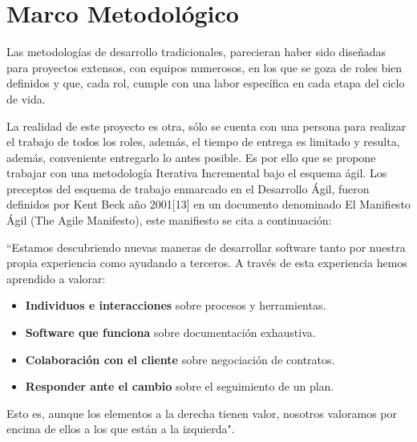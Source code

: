 \chapter{Marco Metodológico}
\label{chap:marcometodologico}

Las metodologías de desarrollo tradicionales, parecieran haber sido diseñadas para proyectos extensos, con equipos numerosos, en los que se goza de roles bien definidos y que, cada rol, cumple con una labor específica en cada etapa del ciclo de vida.

La realidad de este proyecto es otra, sólo se cuenta con una persona para realizar el trabajo de todos los roles, además, el tiempo de entrega es limitado y resulta, además, conveniente entregarlo lo antes posible. Es por ello que se propone trabajar con una metodología Iterativa Incremental bajo el esquema ágil. Los preceptos del esquema de trabajo enmarcado en el Desarrollo Ágil, fueron definidos por Kent Beck año 2001[13] en un documento denominado El Manifiesto Ágil (The Agile Manifesto), este manifiesto se cita a continuación:

``Estamos descubriendo nuevas maneras de desarrollar software tanto por nuestra propia experiencia como ayudando a terceros. A través de esta experiencia hemos aprendido a valorar:

\begin{itemize}
\item \textbf{Individuos e interacciones} sobre procesos y herramientas.
\item \textbf{Software que funciona} sobre documentación exhaustiva.
\item \textbf{Colaboración con el cliente} sobre negociación de contratos.
\item \textbf{Responder ante el cambio} sobre el seguimiento de un plan.
\end{itemize}

Esto es, aunque los elementos a la derecha tienen valor, nosotros valoramos por encima de ellos a los que están a la izquierda".

